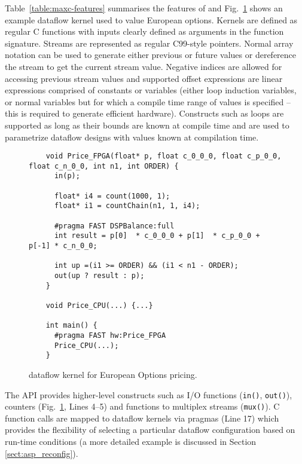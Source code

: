 Table~\ref{table:maxc-features} summarises the features of \MAXC{} and
Fig.~\ref{fig:maxc-1dconv} shows an example dataflow kernel used to
value European options. Kernels are defined as regular C functions
with inputs clearly defined as arguments in the function
signature. Streams are represented as regular C99-style pointers.
Normal array notation can be used to generate either previous or
future values or dereference the stream to get the current stream
value. Negative indices are allowed for accessing previous stream
values and supported offset expressions are linear expressions
comprised of constants or variables (either loop induction variables,
or normal variables but for which a compile time range of values is
specified -- this is required to generate efficient
hardware). Constructs such as loops are supported as long as their
bounds are known at compile time and are used to parametrize dataflow
designs with values known at compilation time.

\lstset{style=MaxC}

\begin{figure}[!h]
  \begin{lstlisting}
    void Price_FPGA(float* p, float c_0_0_0, float c_p_0_0, float c_n_0_0, int n1, int ORDER) {
      in(p);

      float* i4 = count(1000, 1);
      float* i1 = countChain(n1, 1, i4);

      #pragma FAST DSPBalance:full
      int result = p[0]  * c_0_0_0 + p[1]  * c_p_0_0 + p[-1] * c_n_0_0;

      int up =(i1 >= ORDER) && (i1 < n1 - ORDER);
      out(up ? result : p);
    }

    void Price_CPU(...) {...}

    int main() {
      #pragma FAST hw:Price_FPGA
      Price_CPU(...);
    }
  \end{lstlisting}
  \caption{\MAXC{} dataflow kernel for European Options
    pricing.}
  \label{fig:maxc-1dconv}
\end{figure}


The \MAXC{} API provides higher-level constructs such as I/O
functions (\texttt{in()}, \texttt{out()}), counters
(Fig.~\ref{fig:maxc-1dconv}, Lines 4--5) and functions to multiplex
streams (\texttt{mux()}). C function calls are mapped to dataflow
kernels via pragmas (Line 17) which provides the flexibility of
selecting a particular dataflow configuration based on run-time
conditions (a more detailed example is discussed in Section
\ref{sect:asp_reconfig}).
